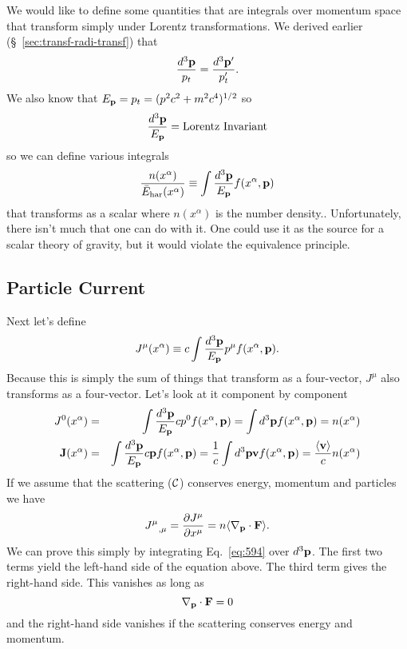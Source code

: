 We would like to define some quantities that are integrals over
momentum space that transform simply under Lorentz transformations.
We derived earlier (\S~\ref{sec:transf-radi-transf}) that
\begin{equation}
\frac{d^3 {\bf p}}{p_t} = \frac{d^3{\bf p}'}{p'_t}.
\label{eq:595}
\end{equation}
We also know that $E_{\bf p} = p_t = (p^2 c^2 + m^2 c^4)^{1/2}$
so
\begin{equation}
\frac{d^3 {\bf p}}{E_{\bf p}} = \hbox{\rm Lorentz Invariant}
\label{eq:596}
\end{equation}
so we can define various integrals
\begin{equation}
\frac{n(x^\alpha)}{{\bar E}_{\hbox{\rm \scriptsize har}}(x^\alpha)} \equiv \int \frac{d^3 {\bf
    p}}{E_{\bf p}} f(x^\alpha, {\bf p})
\label{eq:597}
\end{equation}
that transforms as a scalar where $n(x^\alpha)$ is the number density..  Unfortunately, there isn't much that one
can do with it.  One could use it as the source for a scalar theory of
gravity, but it would violate the equivalence principle.

\subsection{Particle Current}
\label{sec:particle-current}
Next let's define
\begin{equation}
J^\mu (x^\alpha)  \equiv c \int \frac{d^3 {\bf p}}{E_{\bf p}} p^\mu f(x^\alpha, {\bf p}).
\label{eq:598}
\end{equation}
Because this is simply the sum of things that transform as a
four-vector, $J^\mu$ also transforms as a four-vector.  Let's look at
it component by component
\begin{eqnarray}
J^0(x^\alpha) &=& \int \frac{d^3 {\bf p}}{E_{\bf p}} c p^0 f(x^\alpha, {\bf p}) = 
\int d^3 {\bf p} f(x^\alpha, {\bf p}) =  n(x^\alpha) \\
{\bf J}(x^\alpha) &=& \int \frac{d^3 {\bf p}}{E_{\bf p}} c {\bf p}
f(x^\alpha, {\bf p}) = \frac{1}{c} \int d^3 {\bf p} {\bf v} f(x^\alpha, {\bf
  p}) =  \frac{\langle {\bf v} \rangle}{c} n(x^\alpha) 
\label{eq:599}
\end{eqnarray}
If we assume that the scattering (${\cal C}$) conserves energy, momentum
and particles we have
\begin{equation}
J^{\mu}_{~~,\mu} = \frac{\partial {J^\mu}}{\partial {x^\mu}} = n \langle \nabla_{\bf p} \cdot {\bf F} \rangle.
\label{eq:600}
\end{equation}
We can prove this simply by integrating Eq.~\ref{eq:594} over $d^3 {\bf p}$.
The first two terms yield the left-hand side of the equation above.  
The third term gives the right-hand side.  This vanishes
as long as 
\begin{equation}
\nabla_{\bf p} \cdot {\bf F} = 0 
\label{eq:601}
\end{equation}
and the right-hand side vanishes if the scattering conserves energy
and momentum.

